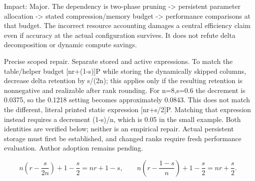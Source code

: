 \documentclass[10pt]{article}
\begin{document}
Impact: Major. The dependency is two-phase pruning -> persistent parameter allocation -> stated compression/memory budget -> performance comparisons at that budget. The incorrect resource accounting damages a central efficiency claim even if accuracy at the actual configuration survives. It does not refute delta decomposition or dynamic compute savings.\par
Precise scoped repair. Separate stored and active expressions. To match the table/helper budget [nr+(1-s)]P while storing the dynamically skipped columns, decrease delta retention by s/(2n); this applies only if the resulting retention is nonnegative and realizable after rank rounding. For n=8,s=0.6 the decrement is 0.0375, so the 0.1218 setting becomes approximately 0.0843. This does not match the different, literal printed static expression [nr+s/2]P. Matching that expression instead requires a decrement (1-s)/n, which is 0.05 in the small example. Both identities are verified below; neither is an empirical repair. Actual persistent storage must first be established, and changed ranks require fresh performance evaluation. Author adoption remains pending.\par
\[n\left(r-\frac{s}{2n}\right)+1-\frac{s}{2}=nr+1-s,\qquad n\left(r-\frac{1-s}{n}\right)+1-\frac{s}{2}=nr+\frac{s}{2}.\]\par
\end{document}
